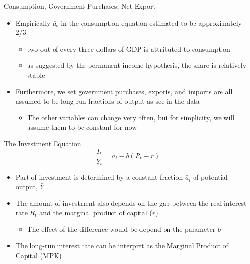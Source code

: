 \documentclass[aspectratio=1610]{beamer}
\begin{document}
\begin{frame}[wide]{Consumption, Government Purchases, Net Export}
	\begin{itemize}
		\item Empirically $\bar{a}_c$ in the consumption equation estimated to be approximately 2/3
		\vspace{2mm}
		\begin{itemize}
			\item two out of every three dollars of GDP is attributed to consumption
			\item as suggested by the permanent income hypothesis, the share is relatively stable
		\end{itemize}
		\vspace{8mm}
		\item Furthermore, we set government purchases, exports, and imports are all assumed to be long-run fractions of output as see in the data
		\vspace{2mm}
		\begin{itemize}
			\item The other variables can change very often, but for simplicity, we will assume them to be constant for now
		\end{itemize}
	\end{itemize}
\end{frame}

\begin{frame}[wide]{The Investment Equation}
	\[\frac{I_t}{\bar{Y}_t} = \bar{a}_i - \bar{b}\left(R_t -\bar{r}\right)\]
	\vspace{4mm}
	\begin{itemize}
		\item Part of investment is determined by a constant fraction $\bar{a}_i$ of potential output, $\bar{Y}$
		\vspace{3mm}
		\item The amount of investment also depends on the gap between the real interest rate $R_t$ and the marginal product of capital ($\bar{r}$)
		\vspace{2mm}
		\begin{itemize}
			\item The effect of the difference would be depend on the parameter $\bar{b}$
		\end{itemize}
		\vspace{3mm}
		\item The long-run interest rate can be interpret as the Marginal Product of Capital (MPK) 
	
	\end{itemize}
\end{frame}
\end{document}
